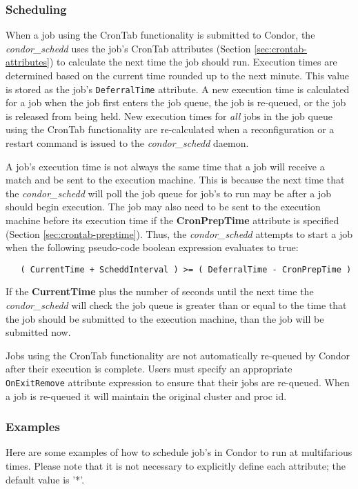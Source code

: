 \documentclass[a4paper, 11pt]{article}
\newcommand{\AdAttr}[1]{\texttt{#1}}	%
\newcommand{\SubmitCmd}[1]{\textbf{#1}}		%
\newcommand{\Prog}[1]{\textit{#1}}              	%
\newcommand{\Condor}[1]{\Prog{condor\_#1}}
\begin{document}
\subsubsection{Scheduling}
\label{sec:crontab-scheduling}
When a job using the CronTab functionality is submitted to Condor, the \Condor{schedd} uses the job's CronTab attributes (Section \ref{sec:crontab-attributes}) to calculate the next time the job should run. Execution times are determined based on the current time rounded up to the next minute. This value is stored as the job's \AdAttr{DeferralTime} attribute. A new execution time is calculated for a job when the job first enters the job queue, the job is re-queued, or the job is released from being held. New execution times for \emph{all} jobs in the job queue using the CronTab functionality are re-calculated when a reconfiguration or a restart command is issued to the
\Condor{schedd} daemon.

A job's execution time is not always the same time that a job will receive a match and be sent to the execution machine. This is because the next time that the \Condor{schedd} will poll the job queue for job's to run may be after a job should begin execution. The job may also need to be  sent to the execution machine before its execution time if the \SubmitCmd{CronPrepTime} attribute is
specified (Section \ref{sec:crontab-preptime}). Thus, the \Condor{schedd} attempts to start a job when the following pseudo-code boolean expression evaluates to true:

\begin{verbatim}
   ( CurrentTime + ScheddInterval ) >= ( DeferralTime - CronPrepTime )
\end{verbatim}

If the \SubmitCmd{CurrentTime} plus the number of seconds until the next time the \Condor{schedd} will check the job queue is greater than or equal to the time that the job should be submitted to the execution machine, than the job will be submitted now.

Jobs using the CronTab functionality are not automatically re-queued by Condor after their execution is complete. Users must specify an appropriate \AdAttr{OnExitRemove} attribute expression to ensure that their jobs are re-queued. When a job is re-queued it will maintain the original cluster and proc id.

\subsubsection{Examples}
\label{sec:crontab-examples}
Here are some examples of how to schedule job's in Condor to
run at multifarious times. Please note that it is not necessary to 
explicitly define each attribute; the default value is '*'.
\end{document}
